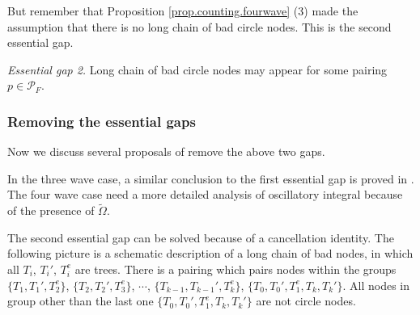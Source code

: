 But remember that Proposition \ref{prop.counting.fourwave} (3) made the assumption that there is no long chain of bad circle nodes. This is the second essential gap.

\textit{Essential gap 2.} Long chain of bad circle nodes may appear for some pairing $p\in \mathcal{P}_F$.

\subsubsection{Removing the essential gaps} Now we discuss several proposals of remove the above two gaps.

In the three wave case, a similar conclusion to the first essential gap is proved in \label{lem.boundcoef.threewave.fourwave}. The four wave case need a more detailed analysis of oscillatory integral because of the presence of $\widetilde{\Omega}$.

The second essential gap can be solved because of a cancellation identity. The following picture is a schematic description of a long chain of bad nodes, in which all $T_i$, $T_i'$, $T_i^e$ are trees. There is a pairing which pairs nodes within the groups $\{T_1, T_1', T_2^e\}$, $\{T_2, T_2', T_3^e\}$, $\cdots$, $\{T_{k-1}, T_{k-1}', T_{k}^e\}$, $\{T_0, T_0', T_1^e, T_k, T_k'\}$. All nodes in group other than the last one $\{T_0, T_0', T_1^e, T_k, T_k'\}$ are not circle nodes.


